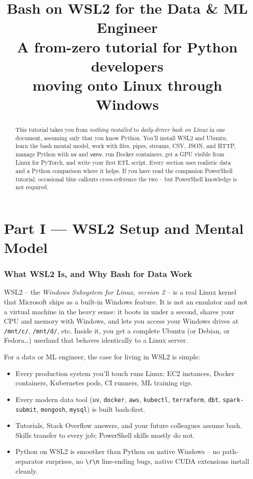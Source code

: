 \documentclass[11pt,a4paper]{article}
\title{\bfseries Bash on WSL2 for the Data \& ML Engineer\\
\large A from-zero tutorial for Python developers\\moving onto Linux through Windows}
\author{}
\date{}
\begin{document}
\maketitle

\begin{abstract}
\noindent
This tutorial takes you from \emph{nothing installed} to \emph{daily-driver
bash on Linux} in one document, assuming only that you know Python. You'll
install WSL2 and Ubuntu, learn the bash mental model, work with files,
pipes, streams, CSV, JSON, and HTTP, manage Python with \texttt{uv} and
\texttt{venv}, run Docker containers, get a GPU visible from Linux for
PyTorch, and write your first ETL script. Every section uses realistic
data and a Python comparison where it helps. If you have read the
companion PowerShell tutorial, occasional blue callouts cross-reference
the two -- but PowerShell knowledge is not required.
\end{abstract}

\tableofcontents
\clearpage

\part*{Part I --- WSL2 Setup and Mental Model}

\section{What WSL2 Is, and Why Bash for Data Work}

WSL2 -- the \emph{Windows Subsystem for Linux, version 2} -- is a real
Linux kernel that Microsoft ships as a built-in Windows feature. It is
not an emulator and not a virtual machine in the heavy sense: it boots
in under a second, shares your CPU and memory with Windows, and lets
you access your Windows drives at \texttt{/mnt/c/}, \texttt{/mnt/d/},
etc. Inside it, you get a complete Ubuntu (or Debian, or Fedora\ldots)
userland that behaves identically to a Linux server.

For a data or ML engineer, the case for living in WSL2 is simple:

\begin{itemize}[leftmargin=*]
\item Every production system you'll touch runs Linux: EC2 instances,
Docker containers, Kubernetes pods, CI runners, ML training rigs.
\item Every modern data tool (\texttt{uv}, \texttt{docker}, \texttt{aws},
\texttt{kubectl}, \texttt{terraform}, \texttt{dbt}, \texttt{spark-submit},
\texttt{mongosh}, \texttt{mysql}) is built bash-first.
\item Tutorials, Stack Overflow answers, and your future colleagues
assume bash. Skills transfer to every job; PowerShell skills mostly do
not.
\item Python on WSL2 is smoother than Python on native Windows -- no
path-separator surprises, no \texttt{\textbackslash{}r\textbackslash{}n}
line-ending bugs, native CUDA extensions install cleanly.
\end{itemize}
\end{document}

